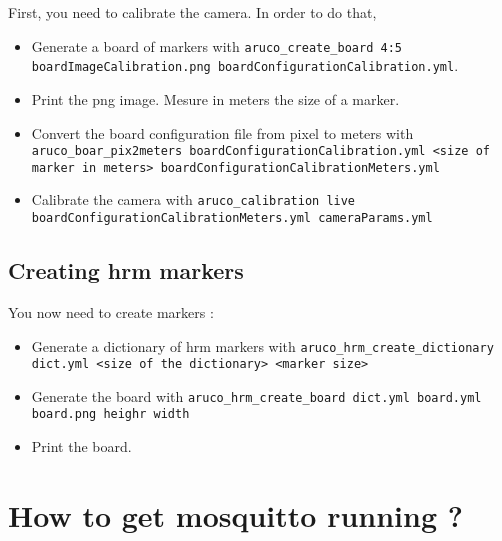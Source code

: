 \documentclass[a4paper,11pt]{report}
\begin{document}
First, you need to calibrate the camera. In order to do that,
\begin{itemize}

    \item Generate a board of markers with \texttt{aruco\_create\_board 4:5
        boardImageCalibration.png boardConfigurationCalibration.yml}.

    \item Print the png image. Mesure in meters the size of a marker.

    \item Convert the board configuration file from pixel to meters with
        \texttt{aruco\_boar\_pix2meters boardConfigurationCalibration.yml <size
        of marker in meters> boardConfigurationCalibrationMeters.yml}

    \item Calibrate the camera with \texttt{aruco\_calibration live
        boardConfigurationCalibrationMeters.yml cameraParams.yml}

\end{itemize}

\subsection{Creating hrm markers}

You now need to create markers :
\begin{itemize}

    \item Generate a dictionary of hrm markers with
        \texttt{aruco\_hrm\_create\_dictionary dict.yml <size of the dictionary> <marker
        size>}

    \item Generate the board with \texttt{aruco\_hrm\_create\_board dict.yml
        board.yml board.png heighr width}

    \item Print the board.

\end{itemize}



\section{How to get mosquitto running ?}
\end{document}
